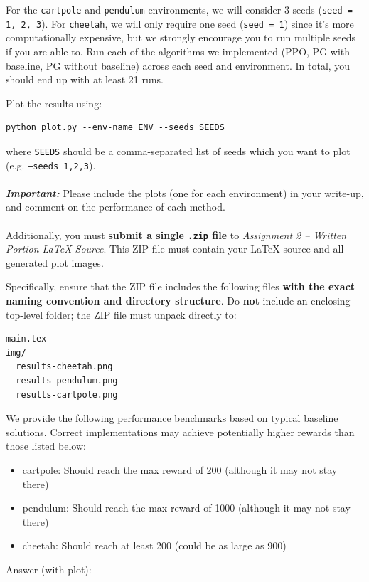 \documentclass{article}
\begin{document}
\begin{enumerate}
For the \texttt{cartpole} and \texttt{pendulum} environments, we will consider 3 seeds (\texttt{seed = 1, 2, 3}). For \texttt{cheetah}, we will only require one seed (\texttt{seed = 1}) since it's more computationally expensive, but we strongly encourage you to run multiple seeds if you are able to. Run each of the algorithms we implemented (PPO, PG with baseline, PG without baseline) across each seed and environment. In total, you should end up with at least 21 runs.

Plot the results using:
\begin{tcolorbox}
\begin{verbatim}
python plot.py --env-name ENV --seeds SEEDS
\end{verbatim}
\end{tcolorbox}
where \texttt{SEEDS} should be a comma-separated list of seeds which you want to plot (e.g. \texttt{--seeds 1,2,3}).\\\\
\textbf{\textit{Important:}} Please include the plots (one for each environment) in your write-up, and comment on the performance of each method. \\\\
Additionally, you must \textbf{submit a single \texttt{.zip} file} to \textit{Assignment 2 -- Written Portion LaTeX Source}. This ZIP file must contain your LaTeX source and all generated plot images.

Specifically, ensure that the ZIP file includes the following files \textbf{with the exact naming convention and directory structure}.  
Do \textbf{not} include an enclosing top-level folder; the ZIP file must unpack directly to:
\begin{verbatim}
main.tex
img/
  results-cheetah.png
  results-pendulum.png
  results-cartpole.png
\end{verbatim}



We provide the following performance benchmarks based on typical baseline solutions. Correct implementations may achieve potentially higher rewards than those listed below:
\begin{itemize}
    \item cartpole: Should reach the max reward of 200 (although it may not stay there)
    \item pendulum: Should reach the max reward of 1000 (although it may not stay there)
    \item cheetah: Should reach at least 200 (could be as large as 900)
\end{itemize}

\begin{tcolorbox}[breakable]
Answer (with plot):
\end{tcolorbox}

\end{enumerate}
\end{document}
